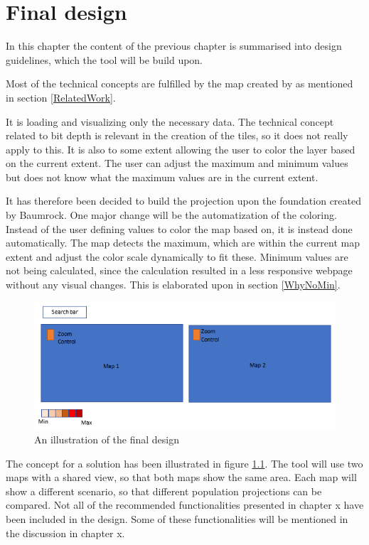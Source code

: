 \chapter{Final design}\label{CFinalDesign}

In this chapter the content of the previous chapter is summarised into design guidelines, which the tool will be build upon. 


Most of the technical concepts are fulfilled by the map created by \citet{Baumrocks} as mentioned in section \ref{RelatedWork}.

It is loading and visualizing only the necessary data. The technical concept related to bit depth is relevant in the creation of the tiles, so it does not really apply to this. 
It is also to some extent allowing the user to color the layer based on the current extent. The user can adjust the maximum and minimum values but does not know what the maximum values are in the current extent.

It has therefore been decided to build the projection upon the foundation created by Baumrock. One major change will be the automatization of the coloring. Instead of the user defining values to color the map based on, it is instead done automatically. The map detects the maximum, which are within the current map extent and adjust the color scale dynamically to fit these. Minimum values are not being calculated, since the calculation resulted in a less responsive webpage without any visual changes. This is elaborated upon in section \ref{WhyNoMin}. 

\begin{figure} [H]
	\centering
	\includegraphics[width=.8\textwidth]{Pictures/FinalDesign}
	\caption{An illustration of the final design}
	\label{FinalDesignFig}
\end{figure}

The concept for a solution has been illustrated in figure \ref{FinalDesignFig}. The tool will use two maps with a shared view, so that both maps show the same area. Each map will show a different scenario, so that different population projections can be compared. Not all of the recommended functionalities presented in chapter x have been included in the design. Some of these functionalities will be mentioned in the discussion in chapter x.

